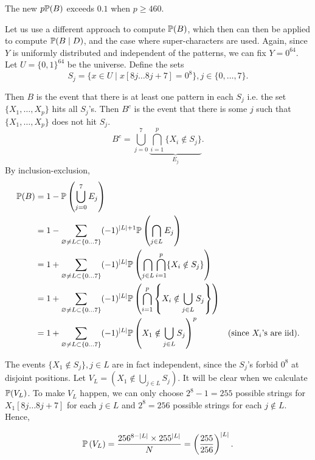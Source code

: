 The new $p\mathbb{P}(B)$ exceeds $0.1$ when $p\ge 460$.

Let us use a different approach to compute $\mathbb{P}(B)$, which then can then be applied to compute $\mathbb{P}(B\mid D)$, and the case where super-characters are used. Again, since $Y$ is uniformly distributed and independent of the patterns, we can fix $Y=0^{64}$. Let $U=\{0,1\}^{64}$ be the universe. Define the sets
$$S_j=\{x\in U \mid x[8j\ldots 8j+7] = 0^8\}, j\in\{0,\ldots, 7\}.$$

Then $B$ is the event that there is at least one pattern in each $S_j$ i.e. the set $\{X_1,\ldots,X_p\}$ hits all $S_j$'s. Then $B^c$ is the event that there is some $j$ such that $\{X_1,\ldots,X_p\}$ does not hit $S_j$.
$$B^c = \bigcup_{j=0}^7 \underbrace{\bigcap_{i=1}^p \{X_i\notin S_j\}}_{E_j}.$$
By inclusion-exclusion,
\begin{align*}
  \mathbb{P}(B)
   & = 1-\mathbb{P}\left(\bigcup_{j=0}^7 E_j\right)                                                                                                                                         \\
   & = 1-\sum_{\varnothing\ne L \subset \{0\ldots 7\}} (-1)^{|L|+1}\mathbb{P}\left(\bigcap_{j\in L} E_j\right)                                                                              \\
   & = 1+\sum_{\varnothing\ne L \subset \{0\ldots 7\}} (-1)^{|L|}\mathbb{P}\left(\bigcap_{j\in L}\bigcap_{i=1}^p \{X_i\notin S_j\}\right)                                                   \\
   & = 1+\sum_{\varnothing\ne L \subset \{0\ldots 7\}} (-1)^{|L|}\mathbb{P}\left(\bigcap_{i=1}^p \left\{X_i\notin \bigcup_{j\in L}S_j\right\}\right)                                        \\
   & = 1+\sum_{\varnothing\ne L \subset \{0\ldots 7\}} (-1)^{|L|}\mathbb{P}\left(X_1\notin \bigcup_{j\in L} S_j\right)^p                             & (\text{since }X_i\text{'s are iid}).
\end{align*}

The events $\{X_1\notin S_j\}, j\in L$ are in fact independent, since the $S_j$'s forbid $0^8$ at disjoint positions. Let $V_L = (X_1\notin \bigcup_{j\in L} S_j)$. It will be clear when we calculate $\mathbb{P}(V_L)$. To make $V_L$ happen, we can only choose $2^8-1=255$ possible strings for $X_1[8j\ldots 8j+7]$ for each $j\in L$ and $2^8=256$ possible strings for each $j\notin L$. Hence,

$$\mathbb{P}\left(V_L\right) = \dfrac{256^{8-|L|}\times 255^{|L|}}{N} = \left(\dfrac{255}{256}\right)^{|L|}.$$

